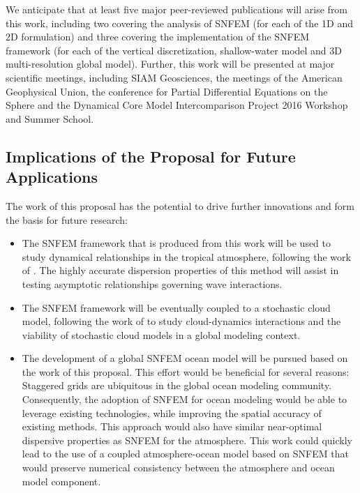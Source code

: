 \documentclass[11pt]{article}
\begin{document}
We anticipate that at least five major peer-reviewed publications will arise from this work, including two covering the analysis of SNFEM (for each of the 1D and 2D formulation) and three covering the implementation of the SNFEM framework (for each of the vertical discretization, shallow-water model and 3D multi-resolution global model). Further, this work will be presented at major scientific meetings, including SIAM Geosciences, the meetings of the American Geophysical Union, the conference for Partial Differential Equations on the Sphere and the Dynamical Core Model Intercomparison Project 2016 Workshop and Summer School.

\subsection{Implications of the Proposal for Future Applications} \label{sec:FutureWork}

The work of this proposal has the potential to drive further innovations and form the basis for future research:

\begin{itemize}
\item The SNFEM framework that is produced from this work will be used to study dynamical relationships in the tropical atmosphere, following the work of \cite{JABAJM2005JAS,JABAJM2010CMS,JABAJM2012JAS}.  The highly accurate dispersion properties of this method will assist in testing asymptotic relationships governing wave interactions.

\item The SNFEM framework will be eventually coupled to a stochastic cloud model, following the work of \cite{BKYHJAB2005JAS,BMKJABAJM2010CMS} to study cloud-dynamics interactions and the viability of stochastic cloud models in a global modeling context.

\item The development of a global SNFEM ocean model will be pursued based on the work of this proposal.  This effort would be beneficial for several reasons:  Staggered grids are ubiquitous in the global ocean modeling community.  Consequently, the adoption of SNFEM for ocean modeling would be able to leverage existing technologies, while improving the spatial accuracy of existing methods.  This approach would also have similar near-optimal dispersive properties as SNFEM for the atmosphere.  This work could quickly lead to the use of a coupled atmosphere-ocean model based on SNFEM that would preserve numerical consistency between the atmosphere and ocean model component.
\end{itemize}

%

{\vbox{}}
\end{document}
